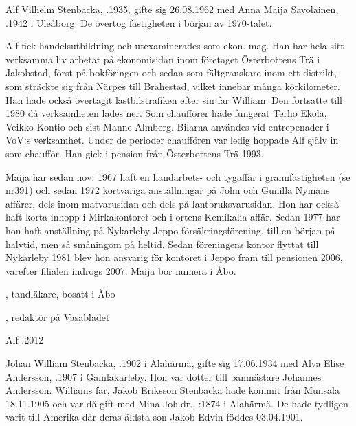 Alf Vilhelm Stenbacka, .1935, gifte sig 26.08.1962 med Anna Maija Savolainen, .1942 i Uleåborg. De övertog fastigheten i början av 1970-talet.

Alf fick handelsutbildning och utexaminerades som ekon. mag. Han har hela sitt verksamma liv arbetat på ekonomisidan inom företaget Österbottens Trä i Jakobstad, först på bokföringen och sedan som fältgranskare inom ett distrikt, som sträckte sig från Närpes till Brahestad, vilket innebar många körkilometer. Han hade också övertagit lastbilstrafiken efter sin far William. Den fortsatte till 1980 då verksamheten lades ner. Som chaufförer hade fungerat Terho Ekola, Veikko Kontio och sist Manne Almberg. Bilarna användes vid entrepenader i VoV:s verksamhet. Under de perioder chauffören var ledig hoppade Alf själv in som chaufför. Han gick i pension från Österbottens Trä 1993.

Maija har sedan nov. 1967 haft en handarbets- och tygaffär i grannfastigheten (se nr391) och sedan 1972 kortvariga anställningar på John och Gunilla Nymans affärer, dels inom matvarusidan och dels på lantbruksvarusidan. Hon har också haft korta inhopp i Mirkakontoret och i ortens Kemikalia-affär. Sedan 1977 har hon  haft anställning på Nykarleby-Jeppo försäkringsförening, till en början på halvtid, men så småningom på heltid. Sedan föreningens kontor flyttat till Nykarleby 1981 blev hon ansvarig för kontoret i Jeppo fram till pensionen 2006, varefter filialen indrogs 2007. Maija bor numera i Åbo.
\begin{jhchildren}
  \item {}, tandläkare, bosatt i Åbo
  \item {}, redaktör på Vasabladet
\end{jhchildren}

Alf .2012


Johan William Stenbacka, .1902 i Alahärmä, gifte sig 17.06.1934 med Alva Elise Andersson, .1907 i Gamlakarleby. Hon var dotter till banmästare Johannes Andersson. Williams far, Jakob Eriksson Stenbacka hade kommit från Munsala 18.11.1905 och var då gift med Mina Joh.dr., :1874 i Alahärmä. De hade tydligen varit till Amerika där deras äldsta son Jakob Edvin föddes 03.04.1901.

